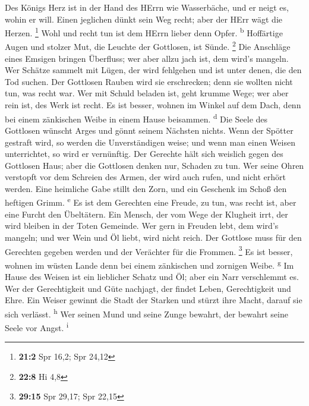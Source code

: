  Des Königs Herz ist in der Hand des HErrn wie
Wasserbäche, und er neigt es, wohin er will.  Einen
jeglichen dünkt sein Weg recht; aber der HErr wägt die Herzen.
\footnote{\textbf{21:2} Spr 16,2; Spr 24,12}  Wohl und
recht tun ist dem HErrn lieber denn Opfer. \textsuperscript{b}
 Hoffärtige Augen und stolzer Mut, die Leuchte der
Gottlosen, ist Sünde. \footnote{\textbf{22:8} Hi 4,8}  Die
Anschläge eines Emsigen bringen Überfluss; wer aber allzu jach ist, dem
wird's mangeln.  Wer Schätze sammelt mit Lügen, der wird
fehlgehen und ist unter denen, die den Tod suchen.  Der
Gottlosen Rauben wird sie erschrecken; denn sie wollten nicht tun, was
recht war.  Wer mit Schuld beladen ist, geht krumme Wege;
wer aber rein ist, des Werk ist recht.  Es ist besser,
wohnen im Winkel auf dem Dach, denn bei einem zänkischen Weibe in einem
Hause beisammen. \textsuperscript{d}  Die Seele des
Gottlosen wünscht Arges und gönnt seinem Nächsten nichts.
 Wenn der Spötter gestraft wird, so werden die
Unverständigen weise; und wenn man einen Weisen unterrichtet, so wird er
vernünftig.  Der Gerechte hält sich weislich gegen des
Gottlosen Haus; aber die Gottlosen denken nur, Schaden zu tun.
 Wer seine Ohren verstopft vor dem Schreien des Armen,
der wird auch rufen, und nicht erhört werden.  Eine
heimliche Gabe stillt den Zorn, und ein Geschenk im Schoß den heftigen
Grimm. \textsuperscript{e}  Es ist dem Gerechten eine
Freude, zu tun, was recht ist, aber eine Furcht den Übeltätern.
 Ein Mensch, der vom Wege der Klugheit irrt, der wird
bleiben in der Toten Gemeinde.  Wer gern in Freuden lebt,
dem wird's mangeln; und wer Wein und Öl liebt, wird nicht reich.
 Der Gottlose muss für den Gerechten gegeben werden und
der Verächter für die Frommen. \footnote{\textbf{29:15} Spr 29,17; Spr
  22,15}  Es ist besser, wohnen im wüsten Lande denn bei
einem zänkischen und zornigen Weibe. \textsuperscript{g} 
Im Hause des Weisen ist ein lieblicher Schatz und Öl; aber ein Narr
verschlemmt es.  Wer der Gerechtigkeit und Güte nachjagt,
der findet Leben, Gerechtigkeit und Ehre.  Ein Weiser
gewinnt die Stadt der Starken und stürzt ihre Macht, darauf sie sich
verlässt. \textsuperscript{h}  Wer seinen Mund und seine
Zunge bewahrt, der bewahrt seine Seele vor Angst. \textsuperscript{i}
